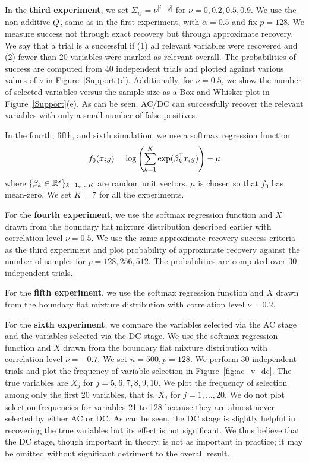 In the \textbf{third experiment}, we set $\Sigma_{ij}=\nu^{|i-j|}$ for $\nu = 0, 0.2, 0.5, 0.9$. We use the non-additive $Q$, same as in the first experiment, with $\alpha=0.5$ and fix $p=128$. We measure success not through exact recovery but through approximate recovery. We say that a trial is a successful if (1) all relevant variables were recovered and (2) fewer than $20$ variables were marked as relevant overall. The probabilities of success are computed from 40 independent trials and plotted against various values of $\nu$ in Figure~\ref{Support}(d). Additionally, for $\nu = 0.5$, we show the number of selected variables versus the sample size as a Box-and-Whisker plot in Figure~\ref{Support}(e). As can be seen, AC/DC can successfully recover the relevant variables with only a small number of false positives. 

In the fourth, fifth, and sixth simulation, we use a softmax regression function
\[
f_0(x_{iS}) = \log \left( \sum_{k=1}^K \exp( \beta_k^{\mathsf{T}} x_{iS} ) \right) - \mu
\]
where $\{\beta_k \in {\mathbb R}^s\}_{k=1,...,K}$ are random unit vectors. $\mu$ is chosen so that $f_0$ has mean-zero. We set $K = 7$ for all the experiments. 

For the \textbf{fourth experiment}, we use the softmax regression function and $X$ drawn from the boundary flat mixture distribution described earlier with correlation level $\nu = 0.5$. We use the same approximate recovery success criteria as the third experiment and plot probability of approximate recovery against the number of samples for $p=128, 256, 512$. The probabilities are computed over 30 independent trials. 

For the \textbf{fifth experiment}, we use the softmax regression function and $X$ drawn from the boundary flat mixture distribution with correlation level $\nu = 0.2$. 

For the \textbf{sixth experiment}, we compare the variables selected via the AC stage and the variables selected via the DC stage. We use the softmax regression function and $X$ drawn from the boundary flat mixture distribution with correlation level $\nu = -0.7$. We set $n=500, p=128$. We perform 30 independent trials and plot the frequency of variable selection in Figure~\ref{fig:ac_v_dc}. The true variables are $X_j$ for $j=5,6,7,8,9,10$. We plot the frequency of selection among only the first 20 variables, that is, $X_j$ for $j=1,...,20$. We do not plot selection frequencies for variables 21 to 128 because they are almost never selected by either AC or DC. As can be seen, the DC stage is slightly helpful in recovering the true variables but its effect is not significant. We thus believe that the DC stage, though important in theory, is not as important in practice; it may be omitted without significant detriment to the overall result. 

